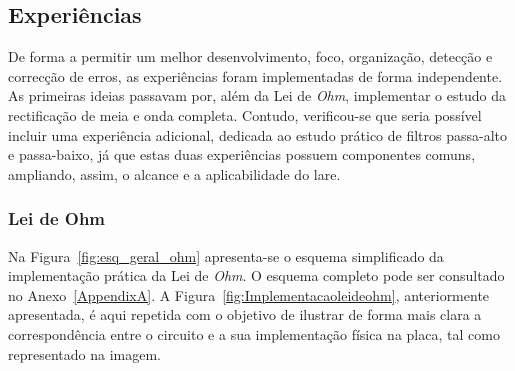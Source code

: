\subsection{Experiências}
\label{sec:experiencias}
De forma a permitir um melhor desenvolvimento, foco, organização, detecção e correcção de erros, as experiências foram implementadas de forma independente. As primeiras ideias passavam por, além da Lei de \textit{Ohm}, implementar o estudo da rectificação de meia e onda completa. Contudo, verificou-se que seria possível incluir uma experiência adicional, dedicada ao estudo prático de filtros passa-alto e passa-baixo, já que estas duas experiências possuem componentes comuns, ampliando, assim, o alcance e a aplicabilidade do \acrshort{lare}.

\subsubsection{Lei de Ohm}
\label{sec:lei_ohm}
Na Figura~\ref{fig:esq_geral_ohm} apresenta-se o esquema simplificado da implementação prática da Lei de \textit{Ohm}. O esquema completo pode ser consultado no Anexo~\ref{AppendixA}. A Figura~\ref{fig:Implementacaoleideohm}, anteriormente apresentada, é aqui repetida com o objetivo de ilustrar de forma mais clara a correspondência entre o circuito e a sua implementação física na placa, tal como representado na imagem.

